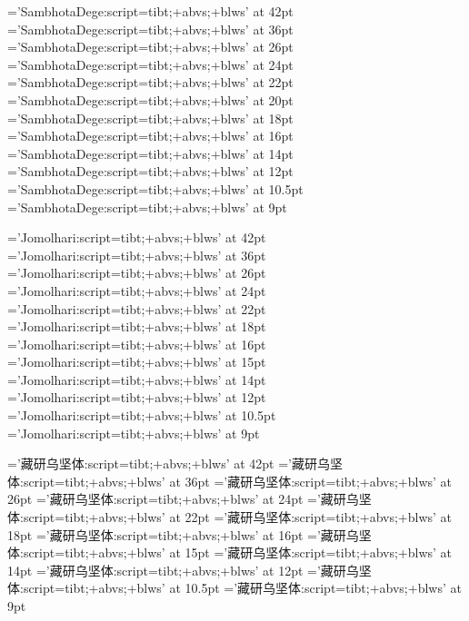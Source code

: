 ﻿
%
%

\def\TibeX{\hbox{Tib\lower.5ex\hbox{E}\kern-.125em X}}

\font\SamThug='SambhotaDege:script=tibt;+abvs;+blws' at 42pt
\font\SamThugu='SambhotaDege:script=tibt;+abvs;+blws' at 36pt
\font\SamkCig='SambhotaDege:script=tibt;+abvs;+blws' at 26pt
\font\SamkCigChung='SambhotaDege:script=tibt;+abvs;+blws' at 24pt
\font\SamkNyis='SambhotaDege:script=tibt;+abvs;+blws' at 22pt
\font\SamkNyisChung='SambhotaDege:script=tibt;+abvs;+blws' at 20pt
\font\SamkSum='SambhotaDege:script=tibt;+abvs;+blws' at 18pt
\font\SamkSumChung='SambhotaDege:script=tibt;+abvs;+blws' at 16pt
\font\SambZhi='SambhotaDege:script=tibt;+abvs;+blws' at 14pt
\font\SambZhiChung='SambhotaDege:script=tibt;+abvs;+blws' at 12pt
\font\SamlNga='SambhotaDege:script=tibt;+abvs;+blws' at 10.5pt
\font\SamlNgaChung='SambhotaDege:script=tibt;+abvs;+blws' at 9pt
\let\Sam=\SamkNyisChung \let\sam=\Sam
\let\SamChe=\SamkNyis
\let\SamAu=\SamkSum

\font\JoThig='Jomolhari:script=tibt;+abvs;+blws' at 42pt
\font\JoThigu='Jomolhari:script=tibt;+abvs;+blws' at 36pt
\font\JokCig='Jomolhari:script=tibt;+abvs;+blws' at 26pt
\font\JokCigChung='Jomolhari:script=tibt;+abvs;+blws' at 24pt
\font\JokNyis='Jomolhari:script=tibt;+abvs;+blws' at 22pt
\font\JokNyisChung='Jomolhari:script=tibt;+abvs;+blws' at 18pt
\font\JokSum='Jomolhari:script=tibt;+abvs;+blws' at 16pt
\font\JokSumChung='Jomolhari:script=tibt;+abvs;+blws' at 15pt
\font\JobZhi='Jomolhari:script=tibt;+abvs;+blws' at 14pt
\font\JobZhiChung='Jomolhari:script=tibt;+abvs;+blws' at 12pt
\font\JolNga='Jomolhari:script=tibt;+abvs;+blws' at 10.5pt
\font\JolNgaChung='Jomolhari:script=tibt;+abvs;+blws' at 9pt
\let\Jo=\JokNyisChung \let\jo=\JokSum
\let\JoChe=\JokNyis
\let\JoAu=\JokSum

\font\ZhibThig='藏研乌坚体:script=tibt;+abvs;+blws' at 42pt
\font\ZhibThigu='藏研乌坚体:script=tibt;+abvs;+blws' at 36pt
\font\ZhibkCig='藏研乌坚体:script=tibt;+abvs;+blws' at 26pt
\font\ZhibkCigChung='藏研乌坚体:script=tibt;+abvs;+blws' at 24pt
\font\ZhibkNyis='藏研乌坚体:script=tibt;+abvs;+blws' at 22pt
\font\ZhibkNyisChung='藏研乌坚体:script=tibt;+abvs;+blws' at 18pt
\font\ZhibkSum='藏研乌坚体:script=tibt;+abvs;+blws' at 16pt
\font\ZhibkSumChung='藏研乌坚体:script=tibt;+abvs;+blws' at 15pt
\font\ZhibbZhi='藏研乌坚体:script=tibt;+abvs;+blws' at 14pt
\font\ZhibbZhiChung='藏研乌坚体:script=tibt;+abvs;+blws' at 12pt
\font\ZhiblNga='藏研乌坚体:script=tibt;+abvs;+blws' at 10.5pt
\font\ZhiblNgaChung='藏研乌坚体:script=tibt;+abvs;+blws' at 9pt
\let\Zhib=\ZhibkSum \let\zhib=\ZhibkSum
\let\ZhibChe=\ZhibkNyis

